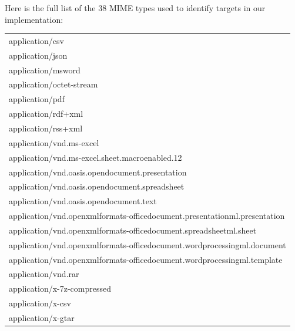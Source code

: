 \begin{toappendix}
	Here is the full list of the 38 MIME types used to identify targets in 
	our implementation:

	\bigskip

	{\ttfamily\begin{tabular}{l}
			application/csv                                                           \\
			application/json                                                          \\
			application/msword                                                        \\
			application/octet-stream                                                  \\
			application/pdf                                                           \\
			application/rdf+xml                                                       \\
			application/rss+xml                                                       \\
			application/vnd.ms-excel                                                  \\
			application/vnd.ms-excel.sheet.macroenabled.12                            \\
			application/vnd.oasis.opendocument.presentation                           \\
			application/vnd.oasis.opendocument.spreadsheet                            \\
			application/vnd.oasis.opendocument.text                                   \\
			application/vnd.openxmlformats-officedocument.presentationml.presentation \\
			application/vnd.openxmlformats-officedocument.spreadsheetml.sheet         \\
			application/vnd.openxmlformats-officedocument.wordprocessingml.document   \\
			application/vnd.openxmlformats-officedocument.wordprocessingml.template   \\
			application/vnd.rar                                                       \\
			application/x-7z-compressed                                               \\
			application/x-csv                                                         \\
			application/x-gtar                                                        \\

\end{tabular}}
\end{toappendix}

